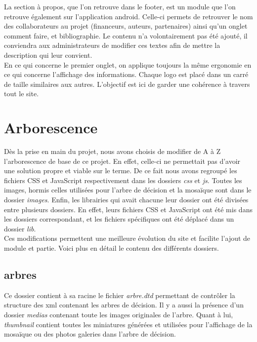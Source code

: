 \documentclass[twoside]{EPURapport}
\begin{document}
	La section à propos, que l'on retrouve dans le footer, est un module que l'on retrouve également sur l'application android. Celle-ci permets de retrouver le nom des collaborateurs au projet (financeurs, auteurs, partenaires) ainsi qu'un onglet comment faire, et bibliographie. Le contenu n'a volontairement pas été ajouté, il conviendra aux administrateurs de modifier ces textes afin de mettre la description qui leur convient.\\
	
	En ce qui concerne le premier onglet, on applique toujours la même ergonomie en ce qui concerne l'affichage des informations. Chaque logo est placé dans un carré de taille similaires aux autres. L'objectif est ici de garder une cohérence à travers tout le site.	
		

	\section{Arborescence}
	Dès la prise en main du projet, nous avons choisis de modifier de A à Z l'arborescence de base de ce projet. En effet, celle-ci ne permettait pas d'avoir une solution propre et viable sur le terme. De ce fait nous avons regroupé les fichiers CSS et JavaScript respectivement dans les dossiers \emph{css} et \emph{js}. Toutes les images, hormis celles utilisées pour l'arbre de décision et la mosaïque sont dans le dossier \emph{images}. Enfin, les librairies qui avait chacune leur dossier ont été divisées entre plusieurs dossiers. En effet, leurs fichiers CSS et JavaScript ont été mis dans les dossiers correspondant, et les fichiers spécifiques ont été déplacé dans un dossier \emph{lib}.\\

	Ces modifications permettent une meilleure évolution du site et facilite l'ajout de module et partie. Voici plus en détail le contenu des différents dossiers.

		\subsection{arbres}
		Ce dossier contient à sa racine le fichier \emph{arbre.dtd} permettant de contrôler la structure des xml contenant les arbres de décision. Il y a aussi la présence d'un dossier \emph{medias} contenant toute les images originales de l'arbre. Quant à lui, \emph{thumbnail} contient toutes les miniatures générées et utilisées pour l'affichage de la mosaïque ou des photos galeries dans l'arbre de décision.
		
\end{document}
